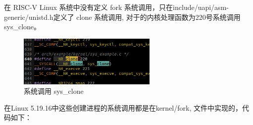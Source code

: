 \documentclass[lang=cn,10pt]{elegantbook}
\begin{document}
在 RISC-V Linux 系统中没有定义 fork 系统调用，只在include/uapi/asm-generic/unistd.h定义了 clone 系统调用, 对于的内核处理函数为220号系统调用 sys\_clone。

\begin{figure}[htbp]
  \centering
  \includegraphics[width=0.6\textwidth]{image/image-20231107202345288.png}
  \caption{系统调用 sys\_clone}
\end{figure}


在Linux 5.19.16中这些创建进程的系统调用都是在kernel/fork, 文件中实现的，代码如下：
\end{document}
